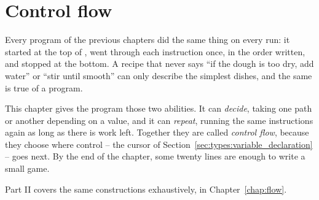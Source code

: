 \chapter{Control flow}
\label{chap:control}

Every program of the previous chapters did the same thing on every run: it
started at the top of , went through each instruction once, in the
order written, and stopped at the bottom. A recipe that never says ``if the
dough is too dry, add water'' or ``stir until smooth'' can only describe the
simplest dishes, and the same is true of a program.

This chapter gives the program those two abilities. It can \emph{decide}, taking
one path or another depending on a value, and it can \emph{repeat}, running the
same instructions again as long as there is work left. Together they are called
\textit{control flow}, because they choose where control -- the cursor of
Section~\ref{sec:types:variable_declaration} -- goes next. By the end of the
chapter, some twenty lines are enough to write a small game.

Part II covers the same constructions exhaustively, in
Chapter~\ref{chap:flow}.

\minitoc%










